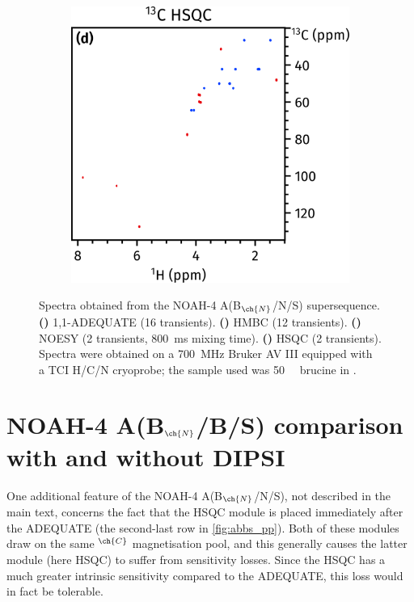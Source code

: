 \documentclass[a4paper,12pt]{article}
\newcommand{\carbon}{\ch{^{13}C}}
\newcommand{\nitrogen}{\ch{^{15}N}}
\newcommand{\magn}[1]{\ch{^1H}$^{#1}$}
\newcommand*{\brucine}{Spectra were obtained on a \SI{700}{\MHz} Bruker AV III equipped with a TCI H/C/N cryoprobe; the sample used was \SI{50}{\milli\molar} brucine in \ch{CDCl3}}
\newcommand{\abnbs}{NOAH-4 A(B$_{\ch{N}}$/B/S)}
\newcommand{\abnns}{NOAH-4 A(B$_{\ch{N}}$/N/S)}
\begin{document}
\begin{refsection}
\begin{figure}[htb]
    \ContinuedFloat
    \begin{subfigure}[b]{\textwidth}
        \centering
        \includegraphics[]{abns_4.png}%
    \end{subfigure}
    {\label{fig:abns_adeq}}
    {\label{fig:abns_n_hmbc}}
    {\label{fig:abns_c_hmbc}}
    {\label{fig:abns_c_hsqc}}
    \caption{
        Spectra obtained from the \abnns{} supersequence.
        \textbf{()} 1,1-ADEQUATE (16 transients).
        \textbf{()} \nitrogen{} HMBC (12 transients).
        \textbf{()} NOESY (2 transients, \SI{800}{\ms} mixing time).
        \textbf{()} \carbon{} HSQC (2 transients).
        \brucine{}.
    }
    \label{fig:abns}
\end{figure}

\clearpage
\section{\texorpdfstring{\abnbs{}}{NOAH-4 A(Bn/B/S)} comparison with and without DIPSI}
\label{sec:si_dipsi}

One additional feature of the \abnns{}, not described in the main text, concerns the fact that the \carbon{} HSQC module is placed immediately after the ADEQUATE (the second-last row in \cref{fig:abbs_pp}).
Both of these modules draw on the same \magn{\ch{C}} magnetisation pool, and this generally causes the latter module (here HSQC) to suffer from sensitivity losses.
Since the HSQC has a much greater intrinsic sensitivity compared to the ADEQUATE, this loss would in fact be tolerable.


\end{refsection}
\end{document}

